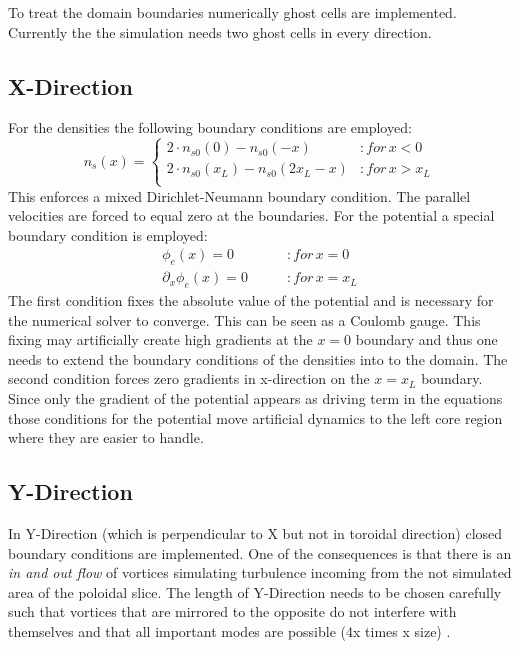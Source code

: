 \documentclass[master.tex]{subfiles}
\begin{document}
To treat the domain boundaries numerically ghost cells are implemented. Currently the the simulation needs two ghost cells in every direction.

\subsection{X-Direction}
For the densities the following boundary conditions are employed:
\begin{equation}
    n_s(x) = \begin{cases}
        2 \cdot n_{s0}(0) - n_{s0}(-x) &\colon for \, x < 0 \\
        2 \cdot n_{s0}(x_L) - n_{s0}(2x_L-x) &\colon for \, x > x_L \\
    \end{cases}
\end{equation}
This enforces a mixed Dirichlet-Neumann boundary condition.
The parallel velocities are forced to equal zero at the boundaries.
For the potential a special boundary condition is employed:
\begin{align}
    \phi_e(x) = 0 \qquad &\colon for \, x = 0\\
    \partial_x\phi_e(x) = 0 \qquad &\colon for \, x = x_L \label{eq:boundary-potential-right}
\end{align}
The first condition fixes the absolute value of the potential and is necessary for the numerical solver to converge. This can be seen as a Coulomb gauge. This fixing may artificially create high gradients at the $x=0$ boundary and thus one needs to extend the boundary conditions of the densities into to the domain. The second condition forces zero gradients in x-direction on the $x=x_L$ boundary. Since only the gradient of the potential appears as driving term in the equations those conditions for the potential move artificial dynamics to the left core region where they are easier to handle. 

\subsection{Y-Direction}
In Y-Direction (which is perpendicular to X but not in toroidal direction) closed boundary conditions are implemented. One of the consequences is that there is an \textit{in and out flow} of vortices simulating turbulence incoming from the not simulated area of the poloidal slice. The length of Y-Direction needs to be chosen carefully such that vortices that are mirrored to the opposite do not interfere with themselves and that all important modes are possible (4x times x size) \cite{ScottFluxTube} \cite{ScottComputationMagneticallyConfinedPlasmas}.
\end{document}
